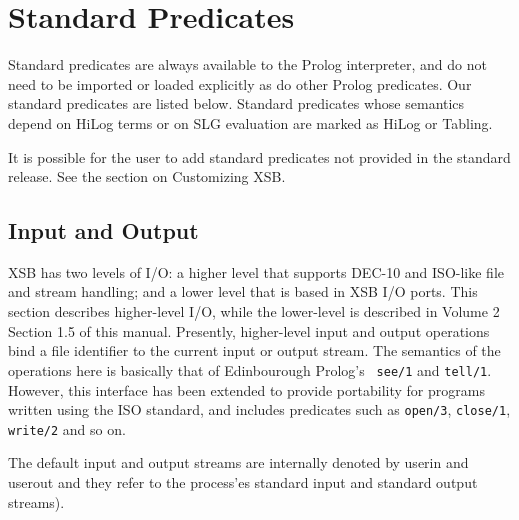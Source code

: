 \chapter{Standard Predicates} \label{standard}

Standard predicates are always available to the Prolog interpreter, and do
not need to be imported or loaded explicitly as do other Prolog predicates.
Our standard predicates are listed below.  Standard predicates whose 
semantics depend on HiLog terms or on SLG evaluation are marked as 
{\sf HiLog} or {\sf Tabling}.

It is possible for the user to add standard predicates not provided
in the standard release. See the section on Customizing XSB.

\section{Input and Output}

XSB has two levels of I/O: a higher level that supports DEC-10 and
ISO-like file and stream handling; and a lower level that is based in
XSB I/O ports.  This section describes higher-level I/O, while the
lower-level is described in Volume 2 Section 1.5 of this manual.
Presently, higher-level input and output operations bind a file
identifier to the current input or output stream.  The semantics of
the operations here is basically that of Edinbourough Prolog's {\tt
see/1} and {\tt tell/1}.  However, this interface has been extended to
provide portability for programs written using the ISO standard, and
includes predicates such as {\tt open/3}, {\tt close/1}, {\tt write/2}
and so on.

The default input and output streams are internally denoted by userin
and userout 
and they refer to the process'es standard input and standard output
streams).


